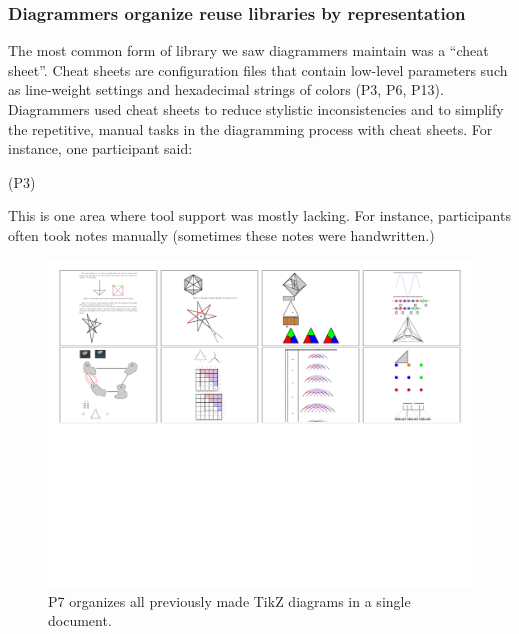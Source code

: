 \subsubsection{Diagrammers organize reuse libraries by representation}

The most common form of library we saw diagrammers maintain was a ``cheat sheet''. Cheat sheets are configuration files that contain low-level parameters such as line-weight settings and hexadecimal strings of colors (P3, P6, P13). Diagrammers used cheat sheets to reduce stylistic inconsistencies and to simplify the repetitive, manual tasks in the diagramming process with cheat sheets.  For instance, one participant said: 

     (P3)
    
This is one area where tool support was mostly lacking. For instance, participants often took notes manually (sometimes these notes were handwritten.)

\begin{figure}[t]
    \centering
    \includegraphics[width=15cm]{assets/interviews/library-cropped.pdf}
    \caption{P7 organizes all previously made TikZ diagrams in a single document.}
    \label{fig:library}
\end{figure}

